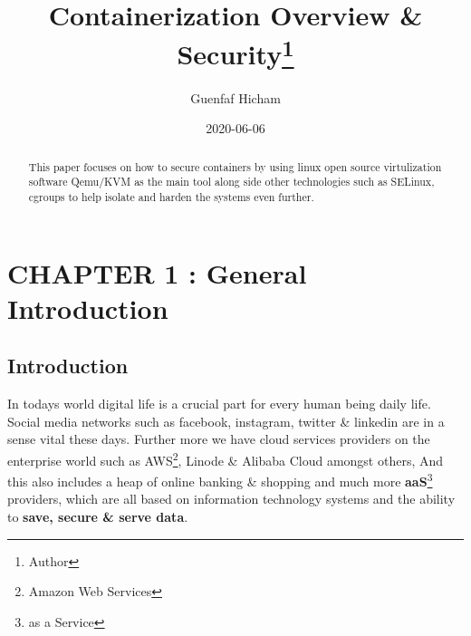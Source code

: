 \documentclass[
  14pt,
  english,
  a4paper,
]{scrreprt}
\title{Containerization Overview \& Security\thanks{Author}}
\author{Guenfaf Hicham}
\date{2020-06-06}
\begin{document}
\maketitle
\begin{abstract}
This paper focuses on how to secure containers by using linux open
source virtulization software Qemu/KVM as the main tool along side other
technologies such as SELinux, cgroups to help isolate and harden the
systems even further.
\end{abstract}

{
\setcounter{tocdepth}{2}
\tableofcontents
}
\listoftables
\listoffigures
\hypertarget{chapter-1-general-introduction}{%
\chapter{CHAPTER 1 : General
Introduction}\label{chapter-1-general-introduction}}

\hypertarget{introduction}{%
\section{Introduction}\label{introduction}}

In todays world digital life is a crucial part for every human being
daily life. Social media networks such as facebook, instagram, twitter
\& linkedin are in a sense vital these days. Further more we have cloud
services providers on the enterprise world such as AWS\footnote{Amazon
  Web Services}, Linode \& Alibaba Cloud amongst others, And this also
includes a heap of online banking \& shopping and much more
\textbf{aaS}\footnote{as a Service} providers, which are all based on
information technology systems and the ability to \textbf{save, secure
\& serve data}.
\end{document}
